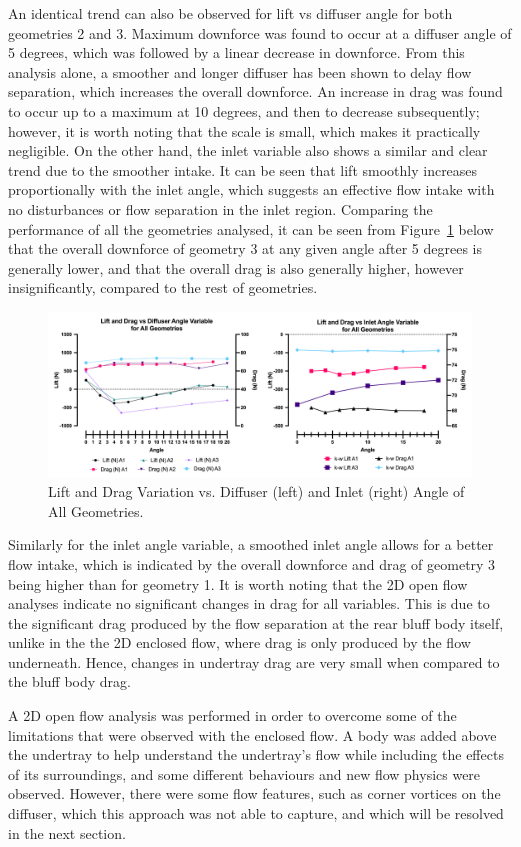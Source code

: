 \noindent An identical trend can also be observed for lift vs diffuser angle for both geometries 2 and 3. Maximum downforce was found to occur at a diffuser angle of 5 degrees, which was followed by a linear decrease in downforce. From this analysis alone, a smoother and longer diffuser has been shown to delay flow separation, which increases the overall downforce. An increase in drag was found to occur up to a maximum at 10 degrees, and then to decrease subsequently; however, it is worth noting that the scale is small, which makes it practically negligible. On the other hand, the inlet variable also shows a similar and clear trend due to the smoother intake. It can be seen that lift smoothly increases proportionally with the inlet angle, which suggests an effective flow intake with no disturbances or flow separation in the inlet region. Comparing the performance of all the geometries analysed, it can be seen from Figure~\ref{fig:2D_OF_PLOT_COMPARE_ALL} below that the overall downforce of geometry 3 at any given angle after 5 degrees is generally lower, and that the overall drag is also generally higher, however insignificantly, compared to the rest of geometries.

\begin{figure}[htb!]
    \centering
    \includegraphics[scale=0.9]{Figures/2D_OF/2D_OF_PLOT_COMPARE_ALL.png}
    \caption{Lift and Drag Variation vs. Diffuser (left) and Inlet (right) Angle of All Geometries.}
    \label{fig:2D_OF_PLOT_COMPARE_ALL}
\end{figure}

\noindent Similarly for the inlet angle variable, a smoothed inlet angle allows for a better flow intake, which is indicated by the overall downforce and drag of geometry 3 being higher than for geometry 1. It is worth noting that the 2D open flow analyses indicate no significant changes in drag for all variables. This is due to the significant drag produced by the flow separation at the rear bluff body itself, unlike in the the 2D enclosed flow, where drag is only produced by the flow underneath. Hence, changes in undertray drag are very small when compared to the bluff body drag.

\noindent A 2D open flow analysis was performed in order to overcome some of the limitations that were observed with the enclosed flow. A body was added above the undertray to help understand the undertray's flow while including the effects of its surroundings, and some different behaviours and new flow physics were observed. However, there were some flow features, such as corner vortices on the diffuser, which this approach was not able to capture, and which  will be resolved in the next section.



